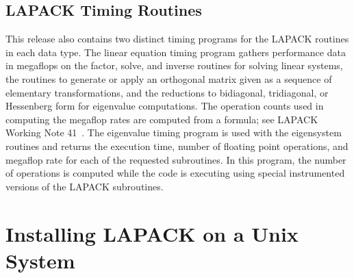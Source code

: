 \subsection{LAPACK Timing Routines}

\hspace{\parindent}
This release also contains two distinct timing programs for the
LAPACK routines in each data type. 
The linear equation timing program gathers performance data in
megaflops on the factor, solve, and inverse routines for solving
linear systems, the routines to generate or apply an orthogonal matrix
given as a sequence of elementary transformations, and the reductions
to bidiagonal, tridiagonal, or Hessenberg form for eigenvalue
computations.
The operation counts used in computing the megaflop rates are computed
from a formula;
see LAPACK Working Note 41~\cite{WN41}.
The eigenvalue timing program is used with the eigensystem routines
and returns the execution time, number of floating point operations, and
megaflop rate for each of the requested subroutines.
In this program, the number of operations is computed while the
code is executing using special instrumented versions of the LAPACK
subroutines.

\section{Installing LAPACK on a Unix System}\label{installation}

